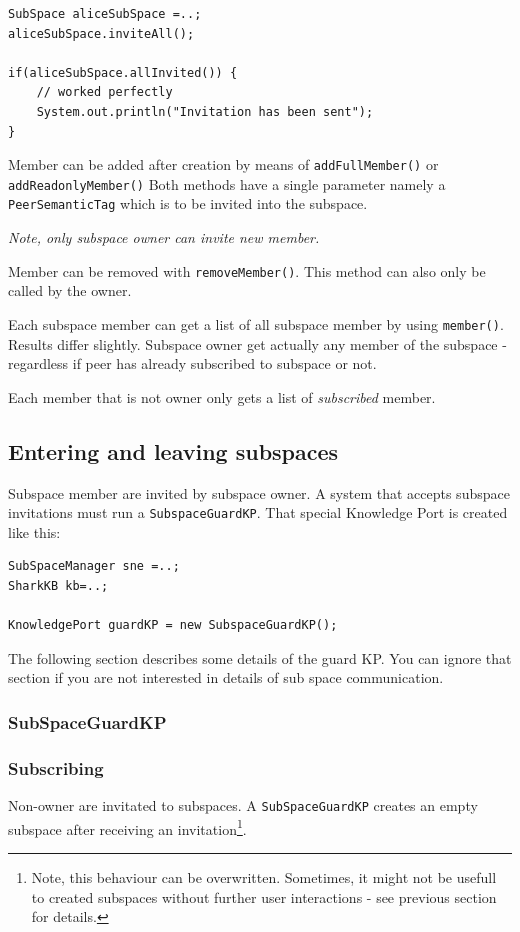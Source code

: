 \begin{verbatim}
SubSpace aliceSubSpace =..;
aliceSubSpace.inviteAll();

if(aliceSubSpace.allInvited()) {
    // worked perfectly
    System.out.println("Invitation has been sent");
}
\end{verbatim}

Member can be added after creation by means of {\verb|addFullMember()|} or
{\verb|addReadonlyMember()|} Both methods have a single parameter namely a \newline
{\verb|PeerSemanticTag|} which is to be invited into the subspace.

{\it Note, only subspace owner can invite new member.}

Member can be removed with {\verb|removeMember()|}. This method can also only be called by the owner.

Each subspace member can get a list of all subspace member by using 
{\verb|member()|}. Results differ slightly. Subspace owner get actually any member
of the subspace - regardless if peer has already subscribed to subspace or not.

Each member that is not owner only gets a list of {\it subscribed} member.

\subsection{Entering and leaving subspaces}
Subspace member are invited by subspace owner. A system that accepts subspace invitations must run a {\verb|SubspaceGuardKP|}. That special Knowledge Port is 
created like this:

\begin{verbatim}
SubSpaceManager sne =..;
SharkKB kb=..;

KnowledgePort guardKP = new SubspaceGuardKP();
\end{verbatim}

The following section describes some details of the guard KP. You can ignore that section if you are not interested in details of sub space communication.

\subsubsection{SubSpaceGuardKP}


\subsubsection{Subscribing}
Non-owner are invitated to subspaces. A {\verb|SubSpaceGuardKP|} creates an empty subspace after receiving an invitation\footnote{Note, this behaviour can be overwritten. Sometimes, it might not be usefull to created subspaces without
further user interactions - see previous section for details.}.

